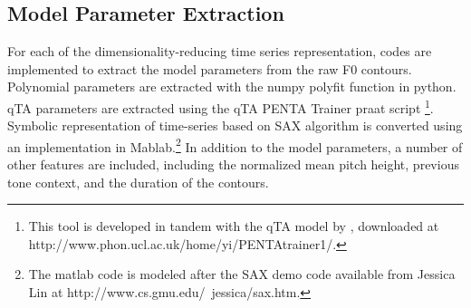 \documentclass{article}
\begin{document}
\subsection{Model Parameter Extraction}
For each of the dimensionality-reducing time series representation, codes are implemented to extract the model parameters from the raw F0 contours. Polynomial parameters are extracted with the numpy polyfit function in python. qTA parameters are extracted using the qTA PENTA Trainer praat script \footnote{This tool is developed in tandem with the qTA model by \cite{prom-on:09}, downloaded at http://www.phon.ucl.ac.uk/home/yi/PENTAtrainer1/.}. Symbolic representation of time-series based on SAX algorithm is converted using an implementation in Mablab.\footnote{The matlab code is modeled after the SAX demo code available from Jessica Lin at http://www.cs.gmu.edu/~jessica/sax.htm.} In addition to the model parameters, a number of other features are included, including the normalized mean pitch height, previous tone context, and the duration of the contours.



























\end{document}
